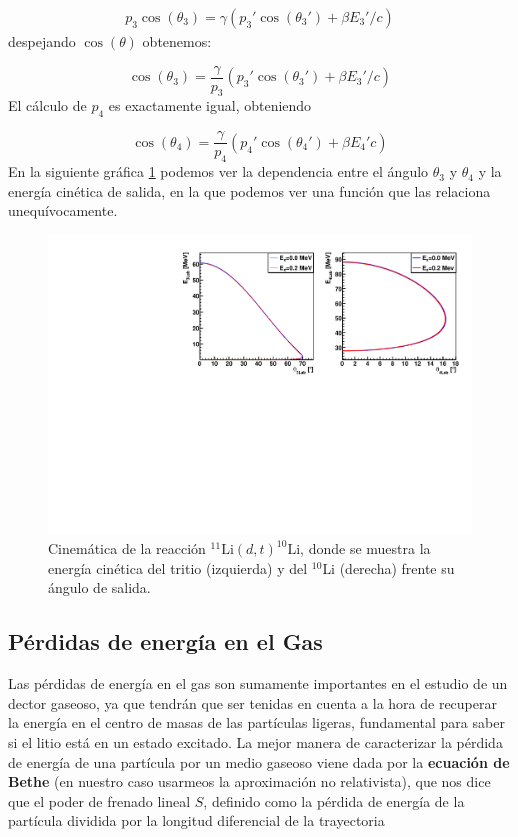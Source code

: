 \begin{eqnarray}
	p_3 \cos (\theta_3) = \gamma (p_3' \cos (\theta_3')+\beta E_3'/c)
\end{eqnarray}
despejando $\cos (\theta)$ obtenemos:

\begin{equation}
	\cos (\theta_3) = \frac{\gamma}{p_3} (p_3' \cos (\theta_3')+\beta E_3'/c)
\end{equation}
El cálculo de $p_4$ es exactamente igual, obteniendo


\begin{equation}
	\cos (\theta_4) = \frac{\gamma}{p_4} (p_4' \cos (\theta_4')+\beta E_4'c)
\end{equation}
En la siguiente gráfica \ref{Fig:04-Kin} podemos ver la dependencia entre el ángulo $\theta_3$ y $\theta_4$ y la energía cinética de salida, en la que podemos ver una función que las relaciona unequívocamente.

\begin{figure}[H] \centering
	\includegraphics[width=0.9\linewidth]{Imagenes/Cinematica.pdf}
	\caption{Cinemática de la reacción $^{11}\text{Li}(d,t)^{10}\text{Li}$, donde se muestra la energía cinética del tritio (izquierda) y del $^{10}$Li (derecha) frente su ángulo de salida.}

	\label{Fig:04-Kin}
\end{figure}


\subsection{Pérdidas de energía en el Gas}

Las pérdidas de energía en el gas son sumamente importantes en el estudio de un dector gaseoso, ya que tendrán que ser tenidas en cuenta a la hora de recuperar la energía en el centro de masas de las partículas ligeras, fundamental para saber si el litio está en un estado excitado. La mejor manera de caracterizar la pérdida de energía de una partícula por un medio gaseoso viene dada por la \textbf{ecuación de Bethe} (en nuestro caso usarmeos la aproximación no relativista), que nos dice que el poder de frenado lineal $S$, definido como la pérdida de energía de la partícula dividida por la longitud diferencial de la trayectoria  \cite{Knoll:1300754}


